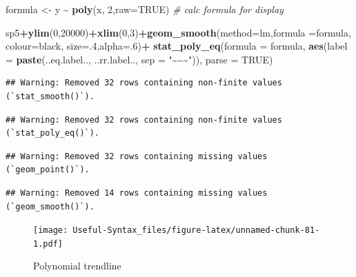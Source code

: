 \documentclass[
]{article}
\newenvironment{Shaded}{\begin{snugshade}}{\end{snugshade}}
\newcommand{\AttributeTok}[1]{\textcolor[rgb]{0.13,0.29,0.53}{#1}}
\newcommand{\CommentTok}[1]{\textcolor[rgb]{0.56,0.35,0.01}{\textit{#1}}}
\newcommand{\ConstantTok}[1]{\textcolor[rgb]{0.56,0.35,0.01}{#1}}
\newcommand{\DecValTok}[1]{\textcolor[rgb]{0.00,0.00,0.81}{#1}}
\newcommand{\FunctionTok}[1]{\textcolor[rgb]{0.13,0.29,0.53}{\textbf{#1}}}
\newcommand{\NormalTok}[1]{#1}
\newcommand{\OtherTok}[1]{\textcolor[rgb]{0.56,0.35,0.01}{#1}}
\newcommand{\SpecialCharTok}[1]{\textcolor[rgb]{0.81,0.36,0.00}{\textbf{#1}}}
\newcommand{\StringTok}[1]{\textcolor[rgb]{0.31,0.60,0.02}{#1}}
\begin{document}
\begin{Shaded}
\begin{Highlighting}[]
\NormalTok{formula }\OtherTok{\textless{}{-}}\NormalTok{ y }\SpecialCharTok{\textasciitilde{}} \FunctionTok{poly}\NormalTok{(x, }\DecValTok{2}\NormalTok{,}\AttributeTok{raw=}\ConstantTok{TRUE}\NormalTok{) }\CommentTok{\# calc formula for display}

\NormalTok{sp5}\SpecialCharTok{+}\FunctionTok{ylim}\NormalTok{(}\DecValTok{0}\NormalTok{,}\DecValTok{20000}\NormalTok{)}\SpecialCharTok{+}\FunctionTok{xlim}\NormalTok{(}\DecValTok{0}\NormalTok{,}\DecValTok{3}\NormalTok{)}\SpecialCharTok{+}\FunctionTok{geom\_smooth}\NormalTok{(}\AttributeTok{method=}\StringTok{\textquotesingle{}lm\textquotesingle{}}\NormalTok{,}\AttributeTok{formula =}\NormalTok{formula,}
                                        \AttributeTok{colour=}\StringTok{\textquotesingle{}black\textquotesingle{}}\NormalTok{, }\AttributeTok{size=}\NormalTok{.}\DecValTok{4}\NormalTok{,}\AttributeTok{alpha=}\NormalTok{.}\DecValTok{6}\NormalTok{)}\SpecialCharTok{+}
  \FunctionTok{stat\_poly\_eq}\NormalTok{(}\AttributeTok{formula =}\NormalTok{ formula,}
               \FunctionTok{aes}\NormalTok{(}\AttributeTok{label =} \FunctionTok{paste}\NormalTok{(..eq.label.., ..rr.label..,}
                                                        \AttributeTok{sep =} \StringTok{"\textasciitilde{}\textasciitilde{}\textasciitilde{}"}\NormalTok{)), }\AttributeTok{parse =} \ConstantTok{TRUE}\NormalTok{)}
\end{Highlighting}
\end{Shaded}

\begin{verbatim}
## Warning: Removed 32 rows containing non-finite values (`stat_smooth()`).
\end{verbatim}

\begin{verbatim}
## Warning: Removed 32 rows containing non-finite values (`stat_poly_eq()`).
\end{verbatim}

\begin{verbatim}
## Warning: Removed 32 rows containing missing values (`geom_point()`).
\end{verbatim}

\begin{verbatim}
## Warning: Removed 14 rows containing missing values (`geom_smooth()`).
\end{verbatim}

\begin{figure}
\centering
\texttt{[image: Useful-Syntax\_files/figure-latex/unnamed-chunk-81-1.pdf]}
\caption{\label{fig:unnamed-chunk-81}Polynomial trendline}
\end{figure}
\end{document}
